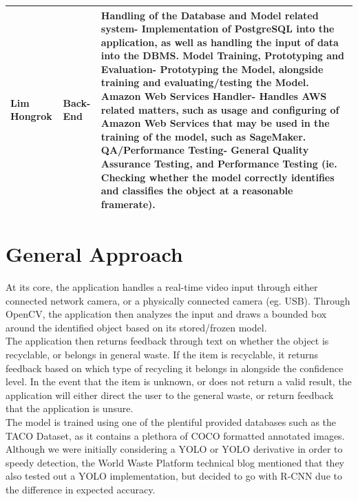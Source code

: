 \documentclass[conference]{IEEEtran}
\begin{document}
\begin{table}[htbp]
\begin{tabular}{|p{1.5cm}|p{1.5cm}|p{4.7cm}|}
Lim Hongrok & Back-End & 
\newline Handling of the Database and Model related system\newline- Implementation of PostgreSQL into the application, as well as handling the input of data into the DBMS.
\newline 
\newline Model Training, Prototyping and Evaluation\newline- Prototyping the Model, alongside training and evaluating/testing the Model.
\newline 
\newline Amazon Web Services Handler\newline- Handles AWS related matters, such as usage and configuring of Amazon Web Services that may be used in the training of the model, such as SageMaker.
\newline 
\newline QA/Performance Testing\newline- General Quality Assurance Testing, and Performance Testing (ie. Checking whether the model correctly identifies and classifies the object at a reasonable framerate).
\\ \hline
\end{tabular}
\end{table}

\newpage

\section{General Approach}
At its core, the application handles a real-time video input through either connected network camera, or a physically connected camera (eg. USB). Through OpenCV, the application then analyzes the input and draws a bounded box around the identified object based on its stored/frozen model.\\

The application then returns feedback through text on whether the object is recyclable, or belongs in general waste. If the item is recyclable, it returns feedback based on which type of recycling it belongs in alongside the confidence level. In the event that the item is unknown, or does not return a valid result, the application will either direct the user to the general waste, or return feedback that the application is unsure.\\

The model is trained using one of the plentiful provided databases such as the TACO Dataset, as it contains a plethora of COCO formatted annotated images. Although we were initially considering a YOLO or YOLO derivative in order to speedy detection, the World Waste Platform technical blog mentioned that they also tested out a YOLO implementation, but decided to go with R-CNN due to the difference in expected accuracy.\\
\end{document}
